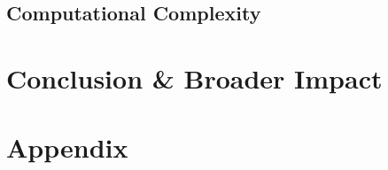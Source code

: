 \subsection{Computational Complexity}

\lipsum[1]

\section{Conclusion \& Broader Impact}

\lipsum[1]

% 




\section*{Appendix}
\appendix



